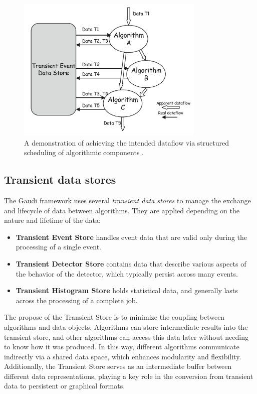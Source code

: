 \begin{figure}[htbp]
  \centering
  \includegraphics[width=0.8\textwidth]{figs/chapter3/Gaudi_dataflow.png}
  \caption{A demonstration of achieving the intended dataflow via structured scheduling of algorithmic components \cite{Gaudi}.}
  \label{fig:Gaudi_dataflow}
\end{figure}

\subsection{Transient data stores}
The Gaudi framework uses several \textit{transient data stores} to manage the exchange and lifecycle of data between algorithms. They are applied depending on the nature and lifetime of the data:

\begin{itemize}
    \item \textbf{Transient Event Store} handles event data that are valid only during the processing of a single event.
    \item \textbf{Transient Detector Store} contains data that describe various aspects of the behavior of the detector, which typically persist across many events.
    \item \textbf{Transient Histogram Store} holds statistical data, and generally lasts across the processing of a complete job.
\end{itemize}

The propose of the Transient Store is to minimize the coupling between algorithms and data objects. Algorithms can store intermediate results into the transient store, and other algorithms can access this data later without needing to know how it was produced. In this way, different algorithms communicate indirectly via a shared data space, which enhances modularity and flexibility. Additionally, the Transient Store serves as an intermediate buffer between different data representations, playing a key role in the conversion from transient data to persistent or graphical formats.
